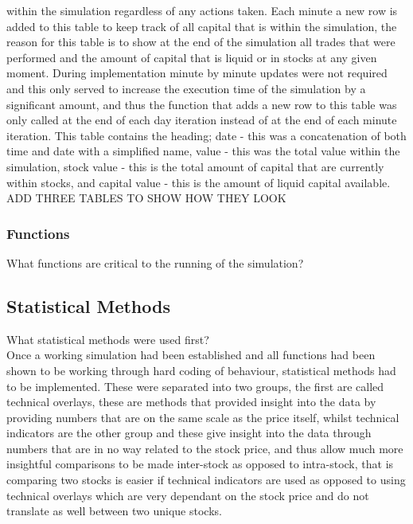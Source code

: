 \documentclass[12pt,a4paper]{article}
\begin{document}
within the simulation regardless of any actions taken. Each minute a new row is added to this table to keep track of all capital that is within the simulation, the reason for this table is to show at the end of the simulation all trades that were performed and the amount of capital that is liquid or in stocks at any given moment. During implementation minute by minute updates were not required and this only served to increase the execution time of the simulation by a significant amount, and thus the function that adds a new row to this table was only called at the end of each day iteration instead of at the end of each minute iteration. This table contains the heading; date - this was a concatenation of both time and date with a simplified name, value - this was the total value within the simulation, stock value - this is the total amount of capital that are currently within stocks, and capital value - this is the amount of liquid capital available. \\

ADD THREE TABLES TO SHOW HOW THEY LOOK\\

\subsubsection*{Functions}

What functions are critical to the running of the simulation? \\

\iffalse
#################################################################################
\fi

\subsection*{Statistical Methods}

What statistical methods were used first?\\

Once a working simulation had been established and all functions had been shown to be working through hard coding of behaviour, statistical methods had to be implemented. These were separated into two groups, the first are called technical overlays, these are methods that provided insight into the data by providing numbers that are on the same scale as the price itself, whilst technical indicators are the other group and these give insight into the data through numbers that are in no way related to the stock price, and thus allow much more insightful comparisons to be made inter-stock as opposed to intra-stock, that is comparing two stocks is easier if technical indicators are used as opposed to using technical overlays which are very dependant on the stock price and do not translate as well between two unique stocks. \\
\end{document}
